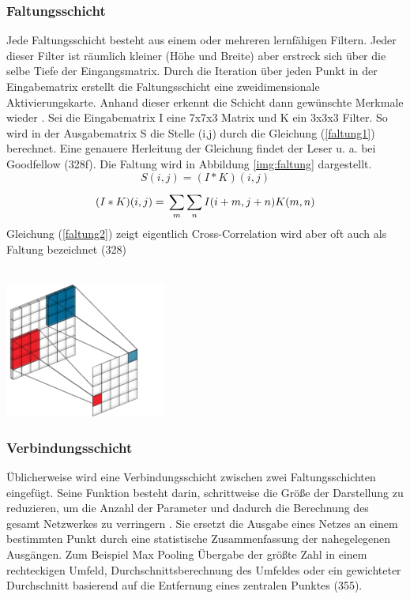 \documentclass[twosided,a4,10pt]{article}
\begin{document}
\begin{multicols}{2}
\subsubsection*{Faltungsschicht}
Jede Faltungsschicht besteht aus einem oder mehreren lernfähigen Filtern. Jeder dieser Filter ist räumlich kleiner (Höhe und Breite) aber erstreck sich über die selbe Tiefe der Eingangsmatrix. Durch die Iteration über jeden Punkt in der Eingabematrix erstellt die Faltungsschicht eine zweidimensionale Aktivierungskarte. Anhand dieser erkennt die Schicht dann gewünschte Merkmale wieder \cite{karpathy}.\newline
Sei die Eingabematrix I eine 7x7x3 Matrix und K ein 3x3x3 Filter. So wird in der Ausgabematrix S die Stelle (i,j) durch die Gleichung (\ref{faltung1}) berechnet. Eine genauere Herleitung der Gleichung findet der Leser u. a. bei Goodfellow \cite{goodfellow}(328f). Die Faltung wird in Abbildung \ref{img:faltung} dargestellt.
\begin{equation}\label{faltung1}
S(i,j) =(I \ast K)(i,j)
\end{equation}
\begin{equation}\label{faltung2}
(I \ast K)(i,j) =\newline\sum_{m}^{}\sum_{n}^{}I(i+m,j+n)K(m,n)
\end{equation}
Gleichung (\ref{faltung2}) zeigt eigentlich Cross-Correlation wird aber oft auch als Faltung bezeichnet \cite{goodfellow}(328)\\
\\
\begin{minipage}{0.45\textwidth}
	\centering
	\includegraphics{img/faltung-klein.png}
	\label{img:faltung}
\end{minipage}

\subsubsection*{Verbindungsschicht}
Üblicherweise wird eine Verbindungsschicht zwischen zwei Faltungsschichten eingefügt. Seine Funktion besteht darin, schrittweise die Größe der Darstellung zu reduzieren, um die Anzahl der Parameter und dadurch die Berechnung des gesamt Netzwerkes zu verringern \cite{karpathy}. Sie ersetzt die Ausgabe eines Netzes an einem bestimmten Punkt durch eine statistische Zusammenfassung der nahegelegenen Ausgängen. Zum Beispiel Max Pooling \cite{zhou} Übergabe der größte Zahl in einem rechteckigen Umfeld, Durchschnittsberechnung des Umfeldes oder ein gewichteter Durchschnitt basierend auf die Entfernung eines zentralen Punktes \cite{goodfellow}(355).


\end{multicols}
\end{document}
